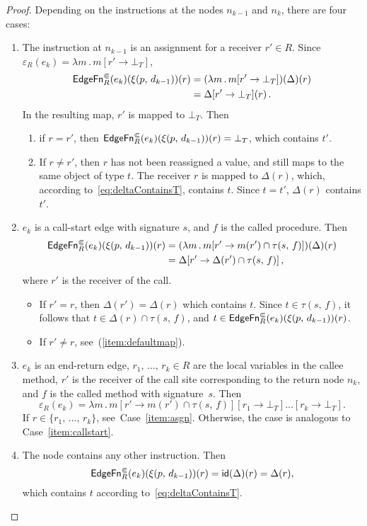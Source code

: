 \begin{proof}
   Depending on the instructions at the nodes $n_{k-1}$ and $n_k$, there are four cases:
  \begin{enumerate}
    \item\label{item:asgn} The instruction at $n_{k-1}$ is an assignment for a receiver $r'\in R$.
        Since $\varepsilon_R(e_k)=\lambda m\,.\,m[r'\to\bot_T]$,
        \begin{align*}
          \textsf{EdgeFn}^\Subset_{R}(e_k)(\xi(p,\,d_{k-1}))(r)&=            
            (\lambda m\,.\,m[r'\to\bot_T])(\Delta)(r)\\
          &=\Delta[r'\to\bot_T](r)\,.
        \end{align*}
      In the resulting map, $r'$ is mapped to $\bot_T$. Then
      
      \begin{enumerate}
        \item if $r=r'$, then $\textsf{EdgeFn}^\Subset_{R}(e_k)(\xi(p,\,d_{k-1}))(r)=\bot_T$, which contains $t'$.
        \item\label{item:defaultmap} If $r\ne r'$, then $r$ has not been reassigned a value, and still maps to the same object of type $t$. The receiver $r$ is mapped to $\Delta(r)$, which, according to~\eqref{eq:deltaContainsT}, contains $t$. Since $t=t'$, $\Delta(r)$ contains $t'$.
      \end{enumerate}
    \item\label{item:callstart} $e_k$ is a call-start edge with signature $s$, and $f$ is the called procedure.
      Then
        \begin{align*}
          \textsf{EdgeFn}^\Subset_{R}(e_k)(\xi(p,\,d_{k-1}))(r)
          &=(\lambda m\,.\,m[r'\to m(r')\cap\tau(s,\,f)])(\Delta)(r)\\
          &=\Delta[r'\to\Delta(r')\cap\tau(s,\,f)]\,,
        \end{align*}
      where $r'$ is the receiver of the call.
      \begin{itemize}
        \item If $r'=r$, then $\Delta(r')=\Delta(r)$ which contains $t$. Since $t\in\tau(s,\,f)$, it follows that $t\in\Delta(r)\cap\tau(s,\,f)$, and $t\in\textsf{EdgeFn}^\Subset_{R}(e_k)(\xi(p,\,d_{k-1}))(r)$.
         \item If $r'\ne r$, see~(\ref{item:defaultmap}).
       \end{itemize}
    \item $e_k$ is an end-return edge, $r_1,\,\dots,\,r_k\in R$ are the local variables in the callee method, $r'$ is the receiver of the call site corresponding to the return node $n_k$, and $f$ is the called method with signature~$s$.
      Then 
      \[
        \varepsilon_R(e_k)=\lambda m\,.\,m[r'\to m(r')\cap\tau(s,\,f)][r_1\to\bot_T]\dots[r_k\to\bot_T].
      \]
      If $r\in\{r_1,\,\dots,\,r_k\}$, see~Case~\ref{item:asgn}. Otherwise, the case is analogous to Case~\ref{item:callstart}.
    \item\label{item:idcase} The node contains any other instruction.
      Then 
      \[
        \textsf{EdgeFn}^\Subset_{R}(e_k)(\xi(p,\,d_{k-1}))(r)=\textsf{id}(\Delta)(r)=\Delta(r),
      \]
      which contains $t$ according to~\eqref{eq:deltaContainsT}.\qedhere
  \end{enumerate}
\end{proof}

